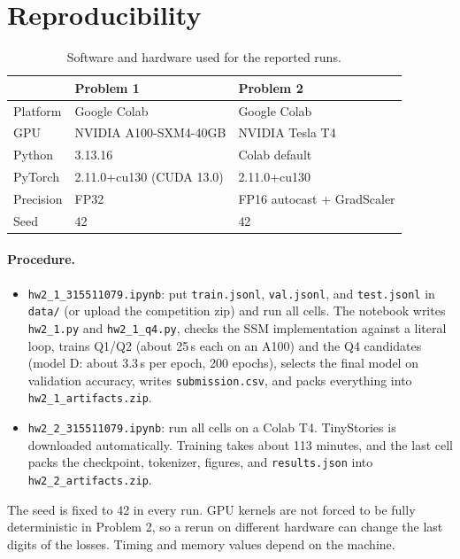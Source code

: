 \documentclass[11pt,a4paper]{article}
\begin{document}

\section{Reproducibility}

\begin{table}[H]
    \centering
    \caption{Software and hardware used for the reported runs.}
    \label{tab:env}
    \begin{tabular}{lll}
        \toprule
        & Problem 1 & Problem 2\\
        \midrule
        Platform & Google Colab & Google Colab\\
        GPU & NVIDIA A100-SXM4-40GB & NVIDIA Tesla T4\\
        Python & 3.13.16 & Colab default\\
        PyTorch & 2.11.0+cu130 (CUDA 13.0) & 2.11.0+cu130\\
        Precision & FP32 & FP16 autocast + GradScaler\\
        Seed & 42 & 42\\
        \bottomrule
    \end{tabular}
\end{table}

\clearpage
\paragraph{Procedure.}
\begin{itemize}
    \item \texttt{hw2\_1\_315511079.ipynb}: put \texttt{train.jsonl},
          \texttt{val.jsonl}, and \texttt{test.jsonl} in \texttt{data/}
          (or upload the competition zip) and run all cells. The notebook
          writes \texttt{hw2\_1.py} and \texttt{hw2\_1\_q4.py}, checks the
          SSM implementation against a literal loop, trains Q1/Q2
          (about 25\,s each on an A100) and the Q4 candidates (model D:
          about 3.3\,s per epoch, 200 epochs), selects the final model
          on validation accuracy, writes \texttt{submission.csv}, and
          packs everything into \texttt{hw2\_1\_artifacts.zip}.
    \item \texttt{hw2\_2\_315511079.ipynb}: run all cells on a Colab T4.
          TinyStories is downloaded automatically. Training takes about
          113 minutes, and the last cell packs the checkpoint, tokenizer,
          figures, and \texttt{results.json} into
          \texttt{hw2\_2\_artifacts.zip}.
\end{itemize}
The seed is fixed to 42 in every run. GPU kernels are not forced to be
fully deterministic in Problem 2, so a rerun on different hardware can
change the last digits of the losses. Timing and memory values depend
on the machine.
\end{document}
